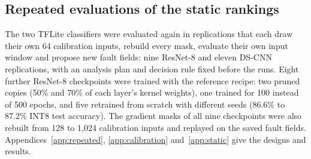 \subsection{Repeated evaluations of the static rankings}\label{sec:repeated}\label{sec:confirm}
The two TFLite classifiers were evaluated again in replications that each draw their own 64 calibration inputs, rebuild every mask, evaluate their own input window and propose new fault fields: nine ResNet-8 and eleven DS-CNN replications, with an analysis plan and decision rule fixed before the runs. Eight further ResNet-8 checkpoints were trained with the reference recipe: two pruned copies (50\% and 70\% of each layer's kernel weights), one trained for 100 instead of 500 epochs, and five retrained from scratch with different seeds (86.6\% to 87.2\% INT8 test accuracy). The gradient masks of all nine checkpoints were also rebuilt from 128 to 1,024 calibration inputs and replayed on the saved fault fields. Appendices~\ref{app:repeated}, \ref{app:calibration} and~\ref{app:static} give the designs and results.

